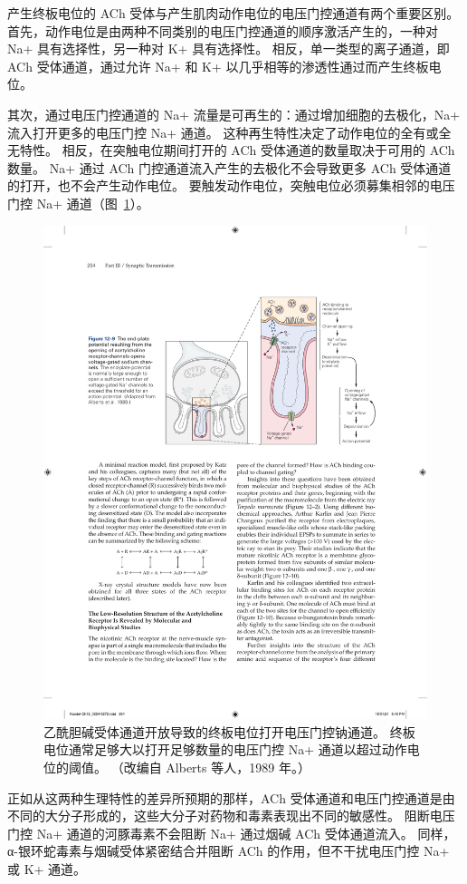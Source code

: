 产生终板电位的 ACh 受体与产生肌肉动作电位的电压门控通道有两个重要区别。
首先，动作电位是由两种不同类别的电压门控通道的顺序激活产生的，一种对 Na+ 具有选择性，另一种对 K+ 具有选择性。
相反，单一类型的离子通道，即 ACh 受体通道，通过允许 Na+ 和 K+ 以几乎相等的渗透性通过而产生终板电位。


其次，通过电压门控通道的 Na+ 流量是可再生的：通过增加细胞的去极化，Na+ 流入打开更多的电压门控 Na+ 通道。
这种再生特性决定了动作电位的全有或全无特性。
相反，在突触电位期间打开的 ACh 受体通道的数量取决于可用的 ACh 数量。
Na+ 通过 ACh 门控通道流入产生的去极化不会导致更多 ACh 受体通道的打开，也不会产生动作电位。
要触发动作电位，突触电位必须募集相邻的电压门控 Na+ 通道（图~\ref{fig:12_9}）。


\begin{figure}[htbp]
	\centering
	\includegraphics[width=0.7\linewidth]{chap12/fig_12_9}
	\caption{乙酰胆碱受体通道开放导致的终板电位打开电压门控钠通道。 终板电位通常足够大以打开足够数量的电压门控 Na+ 通道以超过动作电位的阈值。 （改编自 Alberts 等人，1989 年。）}
	\label{fig:12_9}
\end{figure}


正如从这两种生理特性的差异所预期的那样，ACh 受体通道和电压门控通道是由不同的大分子形成的，这些大分子对药物和毒素表现出不同的敏感性。
阻断电压门控 Na+ 通道的河豚毒素不会阻断 Na+ 通过烟碱 ACh 受体通道流入。
同样，α-银环蛇毒素与烟碱受体紧密结合并阻断 ACh 的作用，但不干扰电压门控 Na+ 或 K+ 通道。



